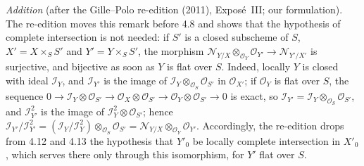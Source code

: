 \emph{Addition} (after the Gille--Polo re-edition (2011), Exposé~III; our
formulation). The re-edition moves this remark before 4.8 and shows that the
hypothesis of complete intersection is not needed: if \(S'\) is a closed
subscheme of \(S\), \(X'=X\times_SS'\) and \(Y'=Y\times_SS'\), the morphism
\(\mathscr N_{Y/X}\otimes_{\mathscr O_Y}\mathscr O_{Y'}\to\mathscr N_{Y'/X'}\)
is surjective, and bijective as soon as \(Y\) is flat over \(S\). Indeed,
locally \(Y\) is closed with ideal \(\mathscr I_Y\), and \(\mathscr I_{Y'}\) is
the image of \(\mathscr I_Y\otimes_{\mathscr O_S}\mathscr O_{S'}\) in
\(\mathscr O_{X'}\); if \(\mathscr O_Y\) is flat over \(S\), the sequence
\(0\to\mathscr I_Y\otimes\mathscr O_{S'}\to\mathscr O_X\otimes\mathscr O_{S'}
\to\mathscr O_Y\otimes\mathscr O_{S'}\to0\) is exact, so
\(\mathscr I_{Y'}=\mathscr I_Y\otimes_{\mathscr O_S}\mathscr O_{S'}\), and
\(\mathscr I_{Y'}^2\) is the image of \(\mathscr I_Y^2\otimes\mathscr O_{S'}\);
hence \(\mathscr I_{Y'}/\mathscr I_{Y'}^2=(\mathscr I_Y/\mathscr I_Y^2)
\otimes_{\mathscr O_S}\mathscr O_{S'}=\mathscr N_{Y/X}\otimes_{\mathscr O_Y}
\mathscr O_{Y'}\). Accordingly, the re-edition drops from 4.12 and 4.13 the
hypothesis that \(Y'_0\) be locally complete intersection in \(X'_0\), which
serves there only through this isomorphism, for \(Y'\) flat over \(S\).

